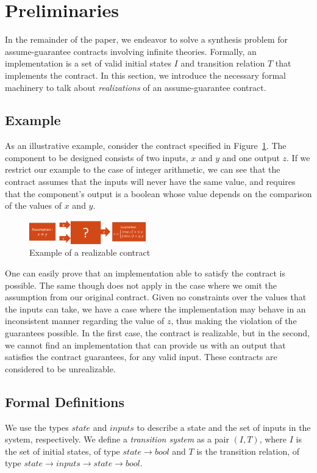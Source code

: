 \section{Preliminaries}
\label{sec:preliminaries}

In the remainder of the paper, we endeavor to solve a synthesis problem for
assume-guarantee contracts involving infinite theories.  Formally, an
implementation is a set of valid initial states $I$ and transition relation $T$ that implements the contract.  In this section, we introduce the necessary formal machinery to talk about {\em realizations} of an assume-guarantee contract.

\subsection{Example}
As an illustrative example, consider the contract specified in
Figure~\ref{fg:example}. The component to be designed consists of two
inputs, $x$ and $y$ and one output $z$. If we restrict our example to the case
of integer arithmetic, we can see that the contract assumes that the inputs will
never have the same value, and requires that the component's output is a boolean
whose value depends on the comparison of the values of $x$ and $y$.

\begin{figure}[H]
	\centering
	\includegraphics[width=0.45\textwidth,height=\textheight,keepaspectratio]{real1-crop}    	
	\caption{Example of a realizable contract}
	\label{fg:example}
\end{figure}


One can easily prove that an implementation able to satisfy the contract is
possible. The same though does not apply in the case where we omit the
assumption from our original contract. Given no constraints over the values that the inputs can take, we have a case where the implementation may
behave in an inconsistent manner regarding the value of $z$, thus making the
violation of the guarantees possible. In the first case, the contract is realizable, but in the second, we
cannot find an implementation that can provide us with an output that satisfies
the contract guarantees, for any valid input. These contracts are considered to
be unrealizable.

\subsection{Formal Definitions}
We use the types $state$ and $inputs$ to describe a state
and the set of inputs in the system, respectively. We define a
\textit{transition system} as a pair $(I,T)$, where $I$ is the set of initial states, of type $state \rightarrow
bool$ and $T$ is the transition relation, of type $state \rightarrow inputs
\rightarrow state \rightarrow bool$. 

